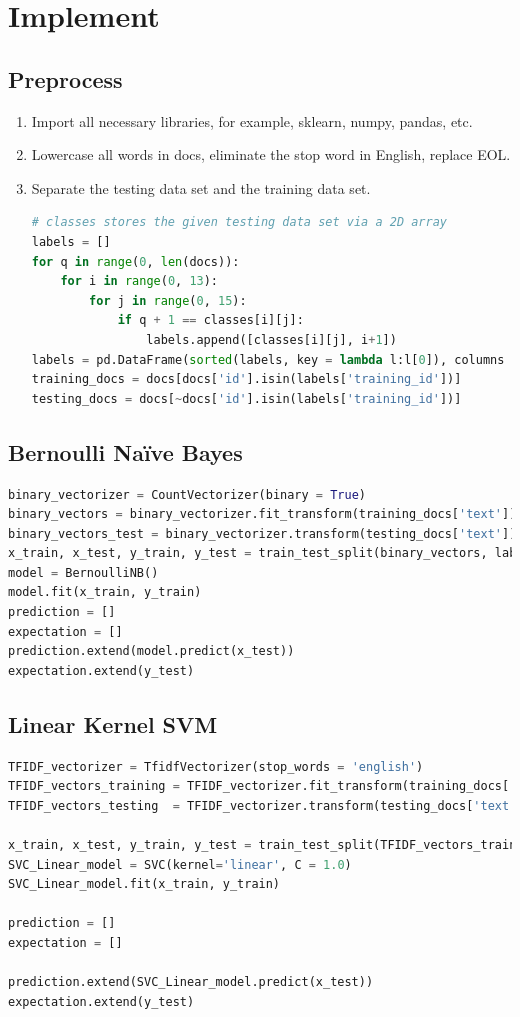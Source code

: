 \documentclass[a4paper]{article}
\theoremstyle{plain}
\begin{document}
\section{Implement}
\subsection{Preprocess}
\begin{enumerate}
\item{
Import all necessary libraries, for example, sklearn, numpy, pandas, etc.
}
    \item{
Lowercase all words in docs, eliminate the stop word in English, replace EOL.
}
\item{
Separate the testing data set and the training data set.
\begin{lstlisting}[language=Python]
# classes stores the given testing data set via a 2D array
labels = []
for q in range(0, len(docs)):
    for i in range(0, 13):
        for j in range(0, 15):
            if q + 1 == classes[i][j]:
                labels.append([classes[i][j], i+1])
labels = pd.DataFrame(sorted(labels, key = lambda l:l[0]), columns = ['training_id', 'classes'])
training_docs = docs[docs['id'].isin(labels['training_id'])]
testing_docs = docs[~docs['id'].isin(labels['training_id'])]
\end{lstlisting}
}
\end{enumerate}

\subsection{Bernoulli Naïve Bayes}
\begin{lstlisting}[language=Python]
binary_vectorizer = CountVectorizer(binary = True)
binary_vectors = binary_vectorizer.fit_transform(training_docs['text'])
binary_vectors_test = binary_vectorizer.transform(testing_docs['text'])
x_train, x_test, y_train, y_test = train_test_split(binary_vectors, labels['classes'], test_size = 0.1) # amazing method taught by my classmates
model = BernoulliNB()
model.fit(x_train, y_train)
prediction = []
expectation = []
prediction.extend(model.predict(x_test))
expectation.extend(y_test)
\end{lstlisting}

\subsection{Linear Kernel SVM}
\begin{lstlisting}[language=Python]
TFIDF_vectorizer = TfidfVectorizer(stop_words = 'english')
TFIDF_vectors_training = TFIDF_vectorizer.fit_transform(training_docs['text'])
TFIDF_vectors_testing  = TFIDF_vectorizer.transform(testing_docs['text'])

x_train, x_test, y_train, y_test = train_test_split(TFIDF_vectors_training, labels['classes'], test_size = 0.1)
SVC_Linear_model = SVC(kernel='linear', C = 1.0)
SVC_Linear_model.fit(x_train, y_train)

prediction = []
expectation = []

prediction.extend(SVC_Linear_model.predict(x_test))
expectation.extend(y_test)
\end{lstlisting}
\end{document}
